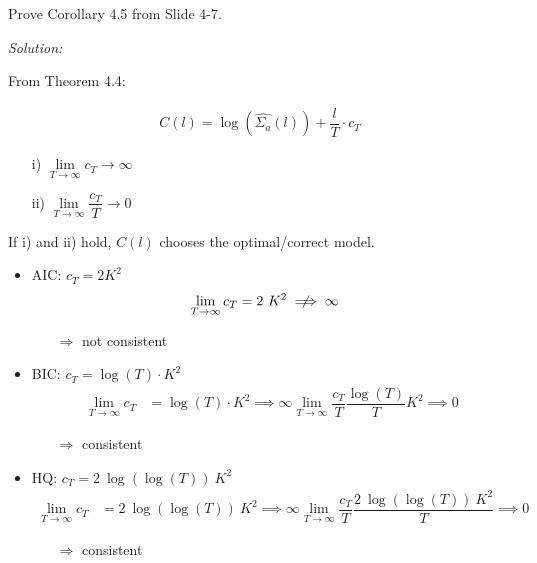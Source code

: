 \documentclass[12pt,a4paper]{article}
\begin{document}
Prove Corollary 4.5 from Slide 4-7.

\emph{Solution:}

From Theorem 4.4:

\begin{align*}
  C(l) = \log \left(\hat{\Sigma_a} (l) \right) + \dfrac{l}{T} \cdot c_T
\end{align*}

\begin{itemize}
  \item[i)] $\lim \limits_{T \rightarrow \infty} c_T \longrightarrow \infty$ 
  \item[ii)] $\lim \limits_{T \rightarrow \infty} \dfrac{c_T}{T} \longrightarrow 0$
\end{itemize}

If i) and ii) hold, \(C(l)\) chooses the optimal/correct model.

\begin{itemize}
  \item AIC: $c_T  = 2K^2$
  \begin{align*}
    \lim \limits_{T \rightarrow \infty} c_T & = 2 \ K^2 \centernot\implies \infty
  \end{align*}
  \begin{itemize}
    \item[$\Rightarrow$] not consistent
  \end{itemize}
  \item BIC: $c_T = \log(T)  \cdot K^2$
    \begin{align*}
    \lim \limits_{T \rightarrow \infty} c_T & = \log(T) \cdot K^2   \implies \infty
    \lim \limits_{T \rightarrow \infty} \dfrac{c_T}{T} \dfrac{\log(T)}{T} K^2 \implies 0 
  \end{align*}
  \begin{itemize}
    \item[$\Rightarrow$] consistent
  \end{itemize}
  \item HQ: $c_T = 2 \ \log(\log(T)) \ K^2$
  \begin{align*}
    \lim \limits_{T \rightarrow \infty} c_T & = 2 \ \log(\log(T)) \ K^2 \implies \infty
    \lim \limits_{T \rightarrow \infty} \dfrac{c_T}{T} \dfrac{2 \ \log(\log(T)) \ K^2}{T} \implies 0 
  \end{align*}
  \begin{itemize}
    \item[$\Rightarrow$] consistent
  \end{itemize}
\end{itemize}
\end{document}
